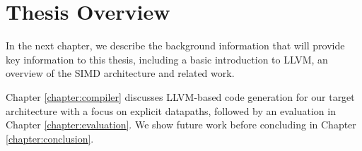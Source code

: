 

\section{Thesis Overview}


In the next chapter, we describe the background information that will provide key information to this thesis, including a basic introduction to LLVM, an overview of the SIMD architecture and related work.

Chapter \ref{chapter:compiler} discusses LLVM-based code generation for our target architecture with a focus on explicit datapaths, followed by an evaluation in Chapter \ref{chapter:evaluation}. We show future work %
before concluding in Chapter \ref{chapter:conclusion}.

